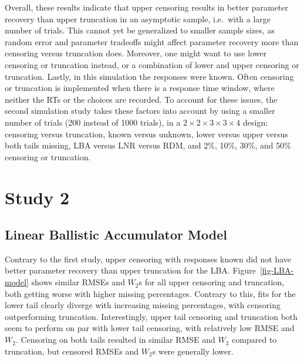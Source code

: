 \documentclass[
  stu,
  longtable,
  nolmodern,
  notxfonts,
  notimes,
  draftfirst,
  colorlinks=true,linkcolor=blue,citecolor=blue,urlcolor=blue]{apa7}
\begin{document}
Overall, these results indicate that upper censoring results in better
parameter recovery than upper truncation in an asymptotic sample,
i.e.~with a large number of trials. This cannot yet be generalized to
smaller sample sizes, as random error and parameter tradeoffs might
affect parameter recovery more than censoring versus truncation does.
Moreover, one might want to use lower censoring or truncation instead,
or a combination of lower and upper censoring or truncation. Lastly, in
this simulation the responses were known. Often censoring or truncation
is implemented when there is a response time window, where neither the
RTs or the choices are recorded. To account for these issues, the second
simulation study takes these factors into account by using a smaller
number of trials (200 instead of 1000 trials), in a
\(2 \times 2 \times 3 \times 3 \times 4\) design: censoring versus
truncation, known versus unknown, lower versus upper versus both tails
missing, LBA versus LNR versus RDM, and 2\%, 10\%, 30\%, and 50\%
censoring or truncation.

\section{Study 2}\label{study-2}

\subsection{Linear Ballistic Accumulator
Model}\label{linear-ballistic-accumulator-model}

Contrary to the first study, upper censoring with responses known did
not have better parameter recovery than upper truncation for the LBA.
Figure~\ref{fig-LBA-model} shows similar RMSEs and \(W_2\)s for all
upper censoring and truncation, both getting worse with higher missing
percentages. Contrary to this, fits for the lower tail clearly diverge
with increasing missing percentages, with censoring outperforming
truncation. Interestingly, upper tail censoring and truncation both seem
to perform on par with lower tail censoring, with relatively low RMSE
and \(W_2\). Censoring on both tails resulted in similar RMSE and
\(W_2\) compared to truncation, but censored RMSEs and \(W_2\)s were
generally lower.
\end{document}
